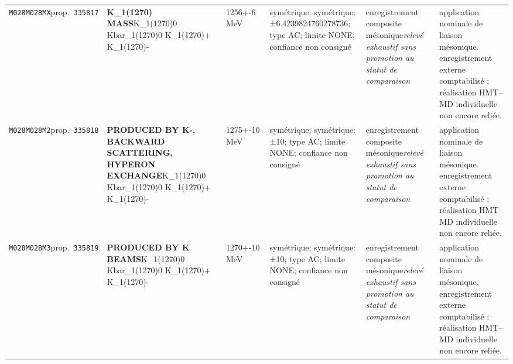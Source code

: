 \begin{landscape}
\begin{longtable}{L{1.85cm}L{4.45cm}L{2.35cm}L{4.05cm}L{3.35cm}L{7.15cm}}
\texttt{M028}\newline \texttt{M028MX}\newline prop.\ \texttt{335817} & \textbf{K\_\allowbreak{}1(1270) MASS}\newline K\_\allowbreak{}1(1270)0 \textbar{}\allowbreak{} Kbar\_\allowbreak{}1(1270)0 \textbar{}\allowbreak{} K\_\allowbreak{}1(1270)+ \textbar{}\allowbreak{} K\_\allowbreak{}1(1270)- & 1256+-6\,MeV & symétrique; symétrique: ±6.4239824760278736; type AC; limite NONE; confiance non consigné & enregistrement composite mésonique\newline \emph{relevé exhaustif sans promotion au statut de comparaison} & application nominale de liaison mésonique. enregistrement externe comptabilisé ; réalisation HMT--MD individuelle non encore reliée. \\
\texttt{M028}\newline \texttt{M028M2}\newline prop.\ \texttt{335818} & \textbf{PRODUCED BY K-, BACKWARD SCATTERING, HYPERON EXCHANGE}\newline K\_\allowbreak{}1(1270)0 \textbar{}\allowbreak{} Kbar\_\allowbreak{}1(1270)0 \textbar{}\allowbreak{} K\_\allowbreak{}1(1270)+ \textbar{}\allowbreak{} K\_\allowbreak{}1(1270)- & 1275+-10\,MeV & symétrique; symétrique: ±10; type AC; limite NONE; confiance non consigné & enregistrement composite mésonique\newline \emph{relevé exhaustif sans promotion au statut de comparaison} & application nominale de liaison mésonique. enregistrement externe comptabilisé ; réalisation HMT--MD individuelle non encore reliée. \\
\texttt{M028}\newline \texttt{M028M3}\newline prop.\ \texttt{335819} & \textbf{PRODUCED BY K BEAMS}\newline K\_\allowbreak{}1(1270)0 \textbar{}\allowbreak{} Kbar\_\allowbreak{}1(1270)0 \textbar{}\allowbreak{} K\_\allowbreak{}1(1270)+ \textbar{}\allowbreak{} K\_\allowbreak{}1(1270)- & 1270+-10\,MeV & symétrique; symétrique: ±10; type AC; limite NONE; confiance non consigné & enregistrement composite mésonique\newline \emph{relevé exhaustif sans promotion au statut de comparaison} & application nominale de liaison mésonique. enregistrement externe comptabilisé ; réalisation HMT--MD individuelle non encore reliée. \\

\end{longtable}
\end{landscape}
